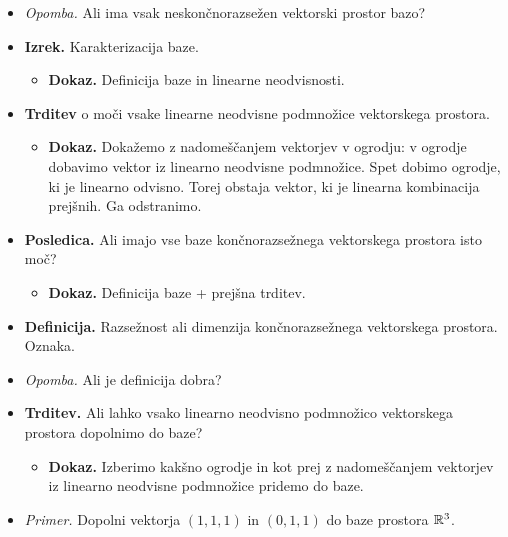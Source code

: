 \begin{enumerate}
\begin{itemize}
\begin{itemize}
        \end{itemize}
        \item \colorbox{yellow!30}{\emph{Opomba.}} Ali ima vsak neskončnorazsežen vektorski prostor bazo?
        \item \colorbox{blue!30}{\textbf{Izrek.}} Karakterizacija baze.
        \begin{itemize}
            \item \colorbox{green!30}{\textbf{Dokaz.}} Definicija baze in linearne neodvisnosti.
        \end{itemize}
        \item \colorbox{blue!30}{\textbf{Trditev}} o moči vsake linearne neodvisne podmnožice vektorskega prostora. 
        \begin{itemize}
            \item \colorbox{green!30}{\textbf{Dokaz.}} Dokažemo z nadomeščanjem vektorjev v ogrodju: v ogrodje dobavimo vektor iz linearno neodvisne podmnožice. Spet dobimo ogrodje, ki je linearno odvisno. Torej obstaja vektor, ki je linearna kombinacija prejšnih. Ga odstranimo.
        \end{itemize}
        \item \colorbox{orange!30}{\textbf{Posledica.}} Ali imajo vse baze končnorazsežnega vektorskega prostora isto moč?
        \begin{itemize}
            \item \colorbox{green!30}{\textbf{Dokaz.}} Definicija baze + prejšna trditev.
        \end{itemize}
        \item \colorbox{purple!30}{\textbf{Definicija.}} Razsežnost ali dimenzija končnorazsežnega vektorskega prostora. Oznaka.
        \item \colorbox{yellow!30}{\emph{Opomba.}} Ali je definicija dobra?
        
        \item \colorbox{blue!30}{\textbf{Trditev.}} Ali lahko vsako linearno neodvisno podmnožico vektorskega prostora dopolnimo do baze?
        \begin{itemize}
            \item \colorbox{green!30}{\textbf{Dokaz.}} Izberimo kakšno ogrodje in kot prej z nadomeščanjem vektorjev iz linearno neodvisne podmnožice pridemo do baze.
        \end{itemize}
        \item \colorbox{yellow!30}{\emph{Primer.}} Dopolni vektorja $(1,1,1)$ in $(0,1,1)$ do baze prostora $\mathbb{R}^3$.     
        

\end{itemize}
\end{enumerate}
